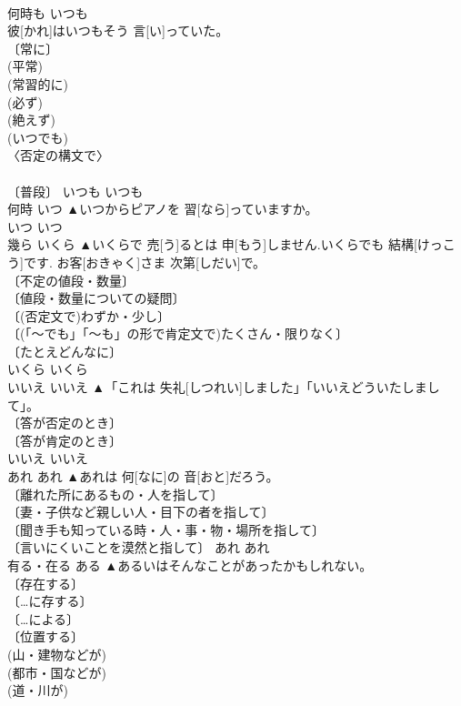 \documentclass[8pt]{extreport}
\begin{document}
\begin{CJK}{UTF8}{min}
\\	何時も	いつも	
\\	彼[かれ]はいつもそう 言[い]っていた。	
\\	〔常に〕 
\\	(平常) 
\\	(常習的に) 
\\	(必ず) 
\\	(絶えず) 
\\	(いつでも) 
\\	〈否定の構文で〉 
\\	[⇒いつでも] 
\\	〔普段〕	いつも	いつも	
\\	何時	いつ	▲いつからピアノを 習[なら]っていますか。	
\\	[⇒いつなんどき]	いつ	いつ	
\\	幾ら	いくら	▲いくらで 売[う]るとは 申[もう]しません.いくらでも 結構[けっこう]です. お客[おきゃく]さま 次第[しだい]で。	
\\	〔不定の値段・数量〕 
\\	〔値段・数量についての疑問〕 
\\	〔(否定文で)わずか・少し〕 
\\	〔(「～でも」「～も」の形で肯定文で)たくさん・限りなく〕 
\\	〔たとえどんなに〕 
\\	いくら	いくら	
\\	いいえ	いいえ	▲「これは 失礼[しつれい]しました」「いいえどういたしまして」。	
\\	〔答が否定のとき〕 
\\	〔答が肯定のとき〕 
\\	いいえ	いいえ	
\\	あれ	あれ	▲あれは 何[なに]の 音[おと]だろう。	
\\	〔離れた所にあるもの・人を指して〕 
\\	〔妻・子供など親しい人・目下の者を指して〕 
\\	〔聞き手も知っている時・人・事・物・場所を指して〕 
\\	〔言いにくいことを漠然と指して〕	あれ	あれ	
\\	有る・在る	ある	▲あるいはそんなことがあったかもしれない。	
\\	〔存在する〕 
\\	〔…に存する〕 
\\	〔…による〕 
\\	〔位置する〕 
\\	(山・建物などが) 
\\	(都市・国などが) 
\\	(道・川が) 

\end{CJK}
\end{document}
